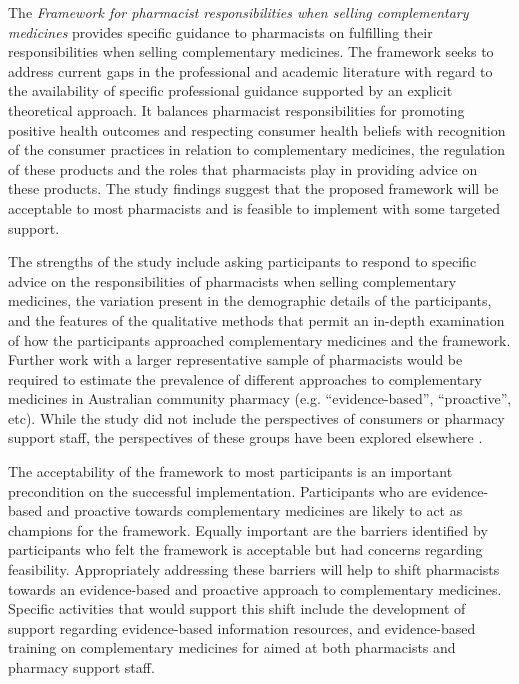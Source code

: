 \documentclass[11pt,a4paper]{article}
\begin{document}
The \emph{Framework for pharmacist responsibilities when selling
complementary medicines} provides specific guidance to pharmacists on
fulfilling their responsibilities when selling complementary medicines.
The framework seeks to address current gaps in the professional and
academic literature with regard to the availability of specific
professional guidance supported by an explicit theoretical approach. It
balances pharmacist responsibilities for promoting positive health
outcomes and respecting consumer health beliefs with recognition of the
consumer practices in relation to complementary medicines, the
regulation of these products and the roles that pharmacists play in
providing advice on these products. The study findings suggest that the
proposed framework will be acceptable to most pharmacists and is
feasible to implement with some targeted support.

The strengths of the study include asking participants to respond to
specific advice on the responsibilities of pharmacists when selling
complementary medicines, the variation present in the demographic
details of the participants, and the features of the qualitative methods
that permit an in-depth examination of how the participants approached
complementary medicines and the framework. Further work with a larger
representative sample of pharmacists would be required to estimate the
prevalence of different approaches to complementary medicines in
Australian community pharmacy (e.g. ``evidence-based'', ``proactive'',
etc). While the study did not include the perspectives of consumers or
pharmacy support staff, the perspectives of these groups have been
explored elsewhere \autocite{Iyer2016a}.

The acceptability of the framework to most participants is an important
precondition on the successful implementation. Participants who are
evidence-based and proactive towards complementary medicines are likely
to act as champions for the framework. Equally important are the
barriers identified by participants who felt the framework is acceptable
but had concerns regarding feasibility. Appropriately addressing these
barriers will help to shift pharmacists towards an evidence-based and
proactive approach to complementary medicines. Specific activities that
would support this shift include the development of support regarding
evidence-based information resources, and evidence-based training on
complementary medicines for aimed at both pharmacists and pharmacy
support staff.
\end{document}
